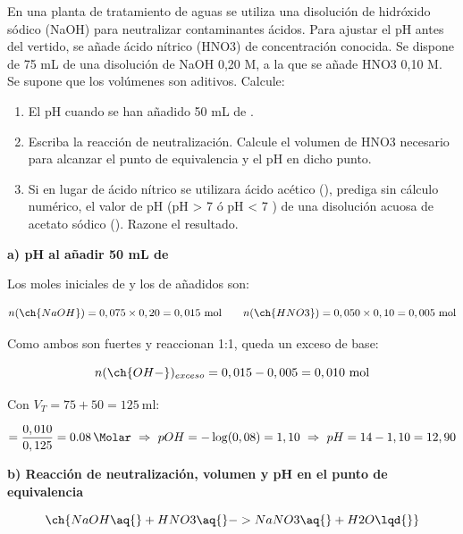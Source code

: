 \begin{exerciseEVAU}
    En una planta de tratamiento de aguas se utiliza una disolución de hidróxido sódico (NaOH) para neutralizar
contaminantes ácidos. Para ajustar el pH antes del vertido, se añade ácido nítrico (HNO3) de concentración
conocida. Se dispone de 75 mL de una disolución de NaOH 0,20 M, a la que se añade HNO3 0,10 M.
Se supone que los volúmenes son aditivos. Calcule:
\begin{enumerate}[label=\letraminuscula]
    \item El pH cuando se han añadido 50 mL de .
    \item Escriba la reacción de neutralización. Calcule el volumen de HNO3 necesario para alcanzar el
punto de equivalencia y el pH en dicho punto.
    \item Si en lugar de ácido nítrico se utilizara ácido acético (), prediga sin cálculo
numérico, el valor de pH (pH > 7 ó pH < 7 ) de una disolución acuosa de acetato sódico (). Razone el resultado.
\end{enumerate}
\begin{solu}

    \textbf{a) pH al añadir 50 mL de }

    Los moles iniciales de  y los de  añadidos son:

    \begin{equation*}
        n(\ch{NaOH}) = 0,075 \times 0,20 = 0,015 \ \text{mol} \qquad n(\ch{HNO3}) = 0,050 \times 0,10 = 0,005 \ \text{mol}
    \end{equation*}

    Como ambos son fuertes y reaccionan 1:1, queda un exceso de base:

    \begin{equation*}
        n(\ch{OH-})_{exceso} = 0,015 - 0,005 = 0,010 \ \text{mol}
    \end{equation*}

    Con \(V_T = 75+50 = \SI{125}{\milli\litre}\):

    \begin{equation*}
        [\ch{OH-}] = \dfrac{0,010}{0,125} = \SI{0.08}{\Molar} \ \Rightarrow \ pOH = -\log(0,08) = 1,10 \ \Rightarrow \ pH = 14 - 1,10 = 12,90
    \end{equation*}

    \textbf{b) Reacción de neutralización, volumen y pH en el punto de equivalencia}

    \begin{equation*}
        \ch{NaOH \aq{} + HNO3 \aq{} -> NaNO3 \aq{} + H2O \lqd{}}
    \end{equation*}


\end{solu}
\end{exerciseEVAU}
